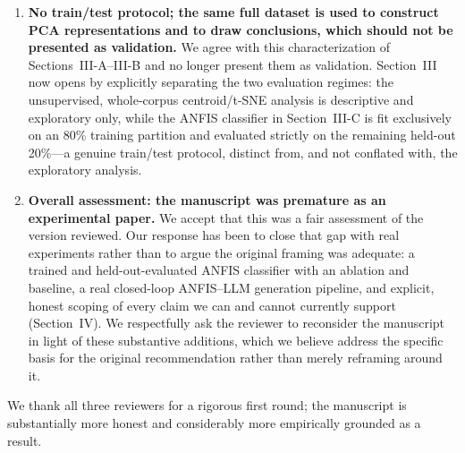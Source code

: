 \documentclass[11pt]{article}
\begin{document}
\begin{enumerate}
\item \textbf{No train/test protocol; the same full dataset is used to construct PCA representations and to draw conclusions, which should not be presented as validation.} We agree with this characterization of Sections~III-A--III-B and no longer present them as validation. Section~III now opens by explicitly separating the two evaluation regimes: the unsupervised, whole-corpus centroid/t-SNE analysis is descriptive and exploratory only, while the ANFIS classifier in Section~III-C is fit exclusively on an 80\% training partition and evaluated strictly on the remaining held-out 20\%---a genuine train/test protocol, distinct from, and not conflated with, the exploratory analysis.

\item \textbf{Overall assessment: the manuscript was premature as an experimental paper.} We accept that this was a fair assessment of the version reviewed. Our response has been to close that gap with real experiments rather than to argue the original framing was adequate: a trained and held-out-evaluated ANFIS classifier with an ablation and baseline, a real closed-loop ANFIS--LLM generation pipeline, and explicit, honest scoping of every claim we can and cannot currently support (Section~IV). We respectfully ask the reviewer to reconsider the manuscript in light of these substantive additions, which we believe address the specific basis for the original recommendation rather than merely reframing around it.
\end{enumerate}

We thank all three reviewers for a rigorous first round; the manuscript is substantially more honest and considerably more empirically grounded as a result.
\end{document}
